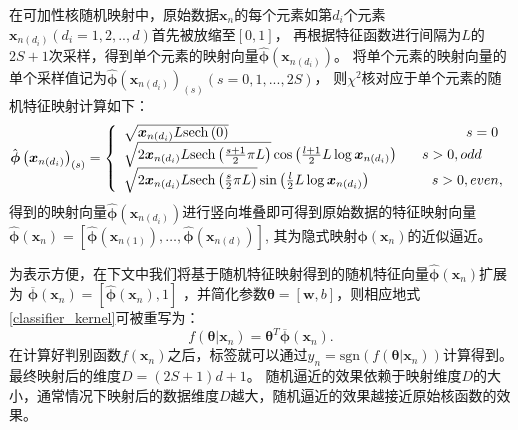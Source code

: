 在可加性核随机映射中，原始数据$\boldsymbol{x}_{n}$的每个元素如第$d_i$个元素$\boldsymbol{x}_{n\left(d_i\right)}\left(d_i=1,2,..,d\right)$首先被放缩至$\left[0,1\right]$，
再根据特征函数进行间隔为$L$的$2S+1$次采样，得到单个元素的映射向量$\hat{\boldsymbol\phi}\left(\boldsymbol{x}_{n\left(d_i\right)}\right)$。
将单个元素的映射向量的单个采样值记为$\hat{\boldsymbol\phi}\left(\boldsymbol{x}_{n\left(d_i\right)}\right)_{\left(s\right)}\left(s=0,1,...,2S\right)$，
则$\chi^2$核对应于单个元素的随机特征映射计算如下：
\begin{equation}
    \label{RFM}
    \begin{split}
		\hat{\boldsymbol\phi}\left(\boldsymbol{x}_{n\left(d_i\right)}\right)_{(s)} = 
		\left\{ \begin{array}{l}
		\sqrt {{\boldsymbol{x}_{n\left(d_i\right)}}L{\mathop{\rm sech}\nolimits} \left( 0 \right)} 
        ~~~~~~~~~~~~~~~~~~~~~~~~~~~~~~~~~~~~~~~~~~~~~~~~~~~s = 0\\
		\sqrt {2{\boldsymbol{x}_{n\left(d_i\right)}}L{\mathop{\rm sech}\nolimits} \left( {\frac{{s + 1}}{2}\pi L} \right)}
        \cos \left( {\frac{{l + 1}}{2}L\log {\boldsymbol{x}_{n\left(d_i\right)}}} \right)~~~~~s > 0, odd\\
		\sqrt {2{\boldsymbol{x}_{n\left(d_i\right)}}L{\mathop{\rm sech}\nolimits} \left( {\frac{s}{2}\pi L} \right)} 
        \sin \left( {\frac{l}{2}L\log {\boldsymbol{x}_{n\left(d_i\right)}}} \right)~~~~~~~~~~~~~s > 0, even,
		\end{array}\right.
	\end{split}
\end{equation}
得到的映射向量$\hat{\boldsymbol\phi}\left(\boldsymbol{x}_{n\left(d_i\right)}\right)$进行竖向堆叠即可得到原始数据的特征映射向量
$\hat{\boldsymbol\phi}\left(\boldsymbol{x}_n\right)= {\left[{\hat{\boldsymbol\phi}\left(\boldsymbol{x}_{n\left(1\right)}\right)},\dots,{\hat{\boldsymbol\phi}\left(\boldsymbol{x}_{n\left(d\right)}\right)}\right]}$, 
其为隐式映射$\boldsymbol\phi\left(\boldsymbol{x}_n\right)$的近似逼近。

为表示方便，在下文中我们将基于随机特征映射得到的随机特征向量$\hat{\boldsymbol\phi}\left(\boldsymbol{x}_n\right)$扩展为
$\overline{\boldsymbol\phi}\left(\boldsymbol{x}_n\right)=\left[\hat{\boldsymbol\phi}\left(\boldsymbol{x}_n\right),1\right]$
，并简化参数$\boldsymbol\theta=\left[\boldsymbol w,b\right]$，则相应地式\eqref{classifier_kernel}可被重写为：
\begin{equation}
    \label{classifier_RFM}
    f\left(\boldsymbol\theta|\boldsymbol x_n\right)={\boldsymbol{\theta}}^T\overline{\boldsymbol\phi}\left(\boldsymbol{x}_n\right).
\end{equation}
在计算好判别函数$f\left(\boldsymbol x_n\right)$之后，标签就可以通过$y_n=\mathrm{sgn}\left(f\left(\boldsymbol\theta|\boldsymbol x_n\right)\right)$计算得到。
最终映射后的维度$D=\left(2S+1\right)d+1$。
{随机逼近的效果依赖于映射维度$D$的大小，通常情况下映射后的数据维度$D$越大，随机逼近的效果越接近原始核函数的效果\cite{Gerace_D_2020}。}

